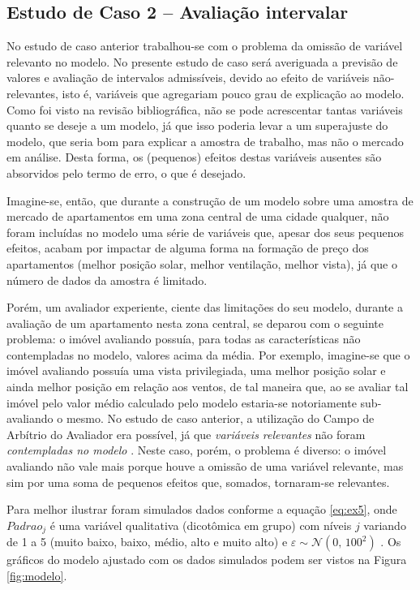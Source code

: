 \documentclass[
  a4paper, 11pt]{article}
\begin{document}
\hypertarget{estudo-de-caso-2-avaliauxe7uxe3o-intervalar}{%
\subsection{Estudo de Caso 2 -- Avaliação
intervalar}\label{estudo-de-caso-2-avaliauxe7uxe3o-intervalar}}

No estudo de caso anterior trabalhou-se com o problema da omissão de
variável relevanto no modelo. No presente estudo de caso será averiguada
a previsão de valores e avaliação de intervalos admissíveis, devido ao
efeito de variáveis não-relevantes, isto é, variáveis que agregariam
pouco grau de explicação ao modelo. Como foi visto na revisão
bibliográfica, não se pode acrescentar tantas variáveis quanto se deseje
a um modelo, já que isso poderia levar a um superajuste do modelo, que
seria bom para explicar a amostra de trabalho, mas não o mercado em
análise. Desta forma, os (pequenos) efeitos destas variáveis ausentes
são absorvidos pelo termo de erro, o que é desejado.

Imagine-se, então, que durante a construção de um modelo sobre uma
amostra de mercado de apartamentos em uma zona central de uma cidade
qualquer, não foram incluídas no modelo uma série de variáveis que,
apesar dos seus pequenos efeitos, acabam por impactar de alguma forma na
formação de preço dos apartamentos (melhor posição solar, melhor
ventilação, melhor vista), já que o número de dados da amostra é
limitado.

Porém, um avaliador experiente, ciente das limitações do seu modelo,
durante a avaliação de um apartamento nesta zona central, se deparou com
o seguinte problema: o imóvel avaliando possuía, para todas as
características não contempladas no modelo, valores acima da média. Por
exemplo, imagine-se que o imóvel avaliando possuía uma vista
privilegiada, uma melhor posição solar e ainda melhor posição em relação
aos ventos, de tal maneira que, ao se avaliar tal imóvel pelo valor
médio calculado pelo modelo estaria-se notoriamente sub-avaliando o
mesmo. No estudo de caso anterior, a utilização do Campo de Arbítrio do
Avaliador era possível, já que \emph{variáveis relevantes} não foram
\emph{contempladas no modelo }. Neste caso, porém, o problema é diverso:
o imóvel avaliando não vale mais porque houve a omissão de uma variável
relevante, mas sim por uma soma de pequenos efeitos que, somados,
tornaram-se relevantes.

Para melhor ilustrar foram simulados dados conforme a equação
\ref{eq:ex5}, onde \(Padrao_j\) é uma variável qualitativa (dicotômica
em grupo) com níveis \(j\) variando de 1 a 5 (muito baixo, baixo, médio,
alto e muito alto) e \(\varepsilon \sim \mathcal{N}(0, \,100^2)\) . Os
gráficos do modelo ajustado com os dados simulados podem ser vistos na
Figura \ref{fig:modelo}.
\end{document}

